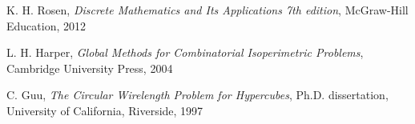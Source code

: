 
\begin{thebibliography}{9}

	K. H. Rosen,
	\emph{Discrete Mathematics and Its Applications 7th edition},
	McGraw-Hill Education, 2012

	L. H. Harper,
	\emph{Global Methods for Combinatorial Isoperimetric Problems},
	Cambridge University Press, 2004

	C. Guu,
	\emph{The Circular Wirelength Problem for Hypercubes},
	Ph.D. dissertation, University of California, Riverside, 1997

\end{thebibliography}
